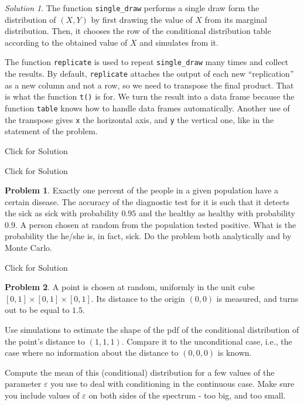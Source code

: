\documentclass[
]{book}
\theoremstyle{definition}
\theoremstyle{definition}
\theoremstyle{definition}
\newtheorem{exercise}{Problem}[chapter]
\theoremstyle{definition}
\theoremstyle{remark}
\newtheorem*{solution}{Solution}
\begin{document}
\begin{solution}
The function \texttt{single\_draw} performs a single draw form the distribution of \((X,Y)\) by first drawing the value of \(X\) from its marginal distribution. Then, it chooses the row of the conditional distribution table according to the obtained value of \(X\) and simulates from it.

The function \texttt{replicate} is used to repeat \texttt{single\_draw} many times and collect the results. By default, \texttt{replicate} attaches the output of each new ``replication'' as a new column and not a row, so we need to transpose the final product. That is what the function \texttt{t()} is for. We turn the result into a data frame because the function \texttt{table} knows how to handle data frames automatically. Another use of the transpose gives \texttt{x} the horizontal axis, and \texttt{y} the vertical one, like in the statement of the problem.
\end{solution}

Click for Solution

Click for Solution

\begin{exercise}
Exactly one percent of the people in a given population have a certain
disease. The accuracy of the diagnostic test for it is such that it
detects the sick as sick with probability \(0.95\) and the healthy as
healthy with probability \(0.9\). A person chosen at random from the
population tested positive. What is the probability the he/she is, in
fact, sick. Do the problem both analytically and by Monte Carlo.
\end{exercise}

Click for Solution

\begin{exercise}
A point is chosen at random, uniformly in the unit cube \([0,1]\times [0,1]\times [0,1]\). Its distance to the origin \((0,0)\) is measured,
and turns out to be equal to \(1.5\).

Use simulations to estimate the shape of the pdf of the conditional
distribution of the point's distance to \((1,1,1)\). Compare
it to the unconditional case, i.e., the case where no information
about the distance to \((0,0,0)\) is known.

Compute the mean of this (conditional) distribution for a few values
of the parameter \(\varepsilon\) you use to deal with conditioning in the
continuous case. Make sure you include values of \(\varepsilon\) on both sides
of the spectrum - too big, and too small.
\end{exercise}
\end{document}
